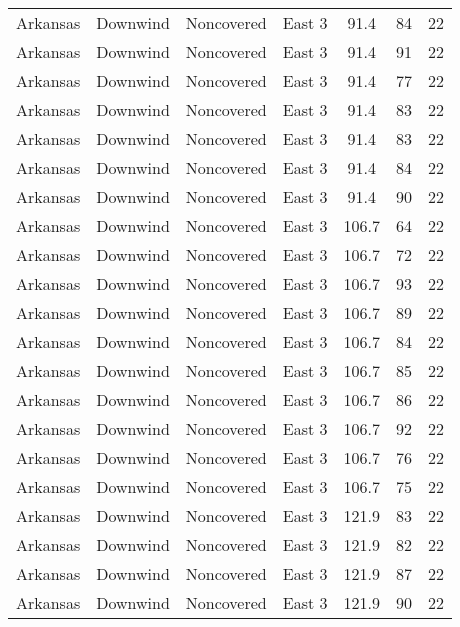 \documentclass{article}
\begin{document}
\begin{longtable}[H]{ccccccc}
Arkansas & Downwind  & Noncovered & East 3        & 91.4         & 84          & 22  \\
Arkansas & Downwind  & Noncovered & East 3        & 91.4         & 91          & 22  \\
Arkansas & Downwind  & Noncovered & East 3        & 91.4         & 77          & 22  \\
Arkansas & Downwind  & Noncovered & East 3        & 91.4         & 83          & 22  \\
Arkansas & Downwind  & Noncovered & East 3        & 91.4         & 83          & 22  \\
Arkansas & Downwind  & Noncovered & East 3        & 91.4         & 84          & 22  \\
Arkansas & Downwind  & Noncovered & East 3        & 91.4         & 90          & 22  \\
Arkansas & Downwind  & Noncovered & East 3        & 106.7        & 64          & 22  \\
Arkansas & Downwind  & Noncovered & East 3        & 106.7        & 72          & 22  \\
Arkansas & Downwind  & Noncovered & East 3        & 106.7        & 93          & 22  \\
Arkansas & Downwind  & Noncovered & East 3        & 106.7        & 89          & 22  \\
Arkansas & Downwind  & Noncovered & East 3        & 106.7        & 84          & 22  \\
Arkansas & Downwind  & Noncovered & East 3        & 106.7        & 85          & 22  \\
Arkansas & Downwind  & Noncovered & East 3        & 106.7        & 86          & 22  \\
Arkansas & Downwind  & Noncovered & East 3        & 106.7        & 92          & 22  \\
Arkansas & Downwind  & Noncovered & East 3        & 106.7        & 76          & 22  \\
Arkansas & Downwind  & Noncovered & East 3        & 106.7        & 75          & 22  \\
Arkansas & Downwind  & Noncovered & East 3        & 121.9        & 83          & 22  \\
Arkansas & Downwind  & Noncovered & East 3        & 121.9        & 82          & 22  \\
Arkansas & Downwind  & Noncovered & East 3        & 121.9        & 87          & 22  \\
Arkansas & Downwind  & Noncovered & East 3        & 121.9        & 90          & 22  \\

\end{longtable}
\end{document}

